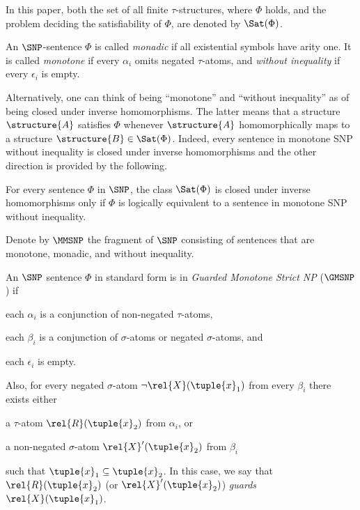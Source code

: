 \documentclass{lmcs}
\begin{document}
In this paper, both the set of all finite $\tau$-structures, where $\Phi$ holds, and the problem deciding the satisfiability of $\Phi$, are denoted by $\Sat(\Phi)$.






An $\SNP$-sentence $\Phi$ is called \emph{monadic} if all existential symbols have arity one.
%
It is called \emph{monotone} if every $\alpha_i$ omits negated $\tau$-atoms, and \emph{without inequality} if every $\epsilon_i$ is empty.

Alternatively, one can think of being ``monotone'' and ``without inequality'' as of being closed under
inverse homomorphisms. The latter means that a structure $\structure{A}$ satisfies $\Phi$ whenever $\structure{A}$ homomorphically maps to a structure $\structure{B}\in\Sat(\Phi)$.
Indeed, every sentence in monotone SNP without inequality is closed under inverse homomorphisms and the other direction is provided by the following.
\begin{thmC}\label{th:monotone-hom-closed} 
For every sentence $\Phi$ in $\SNP$, the class $\Sat(\Phi)$ is closed under inverse homomorphisms only if $\Phi$ is logically equivalent to a sentence in monotone SNP without inequality.
\end{thmC}

Denote by $\MMSNP$ the fragment of $\SNP$ consisting of sentences that are monotone, monadic, and without inequality.

An $\SNP$ sentence $\Phi$ in standard form is in \emph{Guarded Monotone Strict NP} ($\GMSNP$) if
\begin{inparaenum}[(a)]
\item each $\alpha_i$ is a conjunction of non-negated $\tau$-atoms,
\item each $\beta_i$ is a conjunction of $\sigma$-atoms or negated $\sigma$-atoms, and
\item each $\epsilon_i$ is empty.
\end{inparaenum}
Also, for every negated $\sigma$-atom $\neg \rel{X}(\tuple{x}_1)$ from every $\beta_i$ there exists either
\begin{inparaenum}[(i)]
\item a $\tau$-atom $\rel{R}(\tuple{x}_2)$ from $\alpha_i$, or
\item a non-negated $\sigma$-atom $\rel{X}'(\tuple{x}_2)$ from $\beta_i$
\end{inparaenum}  
such that $\tuple{x}_1\subseteq\tuple{x}_2$.
In this case, we say that $\rel{R}(\tuple{x}_2)$ (or $\rel{X}'(\tuple{x}_2)$) \emph{guards} $\rel{X}(\tuple{x}_1)$.
\end{document}
